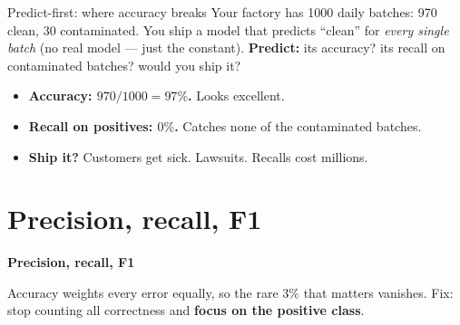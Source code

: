 \documentclass[aspectratio=169]{beamer}
\begin{document}
\begin{frame}{Predict-first: where accuracy breaks}
  Your factory has 1000 daily batches: 970 clean, 30 contaminated. You ship a model that
  predicts ``clean'' for \emph{every single batch} (no real model --- just the constant).
  \vfill
  \textbf{Predict:} its accuracy? its recall on contaminated batches? would you ship it?
  \vfill
  \begin{itemize}
    \item \textbf{Accuracy: $970/1000 = 97\%$.} Looks excellent.
    \item \textbf{Recall on positives: $0\%$.} Catches none of the contaminated batches.
    \item \textbf{Ship it?} Customers get sick. Lawsuits. Recalls cost millions.
  \end{itemize}
  \vfill
\end{frame}

\section{Precision, recall, F1}

\begin{frame}[plain]
  \vfill
  \begin{center}
    {\Large\color{popblue}\textbf{Precision, recall, F1}}\\[0.9em]
    \begin{minipage}{0.82\textwidth}\centering\small
      Accuracy weights every error equally, so the rare $3\%$ that matters vanishes.
      Fix: stop counting all correctness and \textbf{focus on the positive class}.
    \end{minipage}
  \end{center}
  \vfill
\end{frame}
\end{document}
